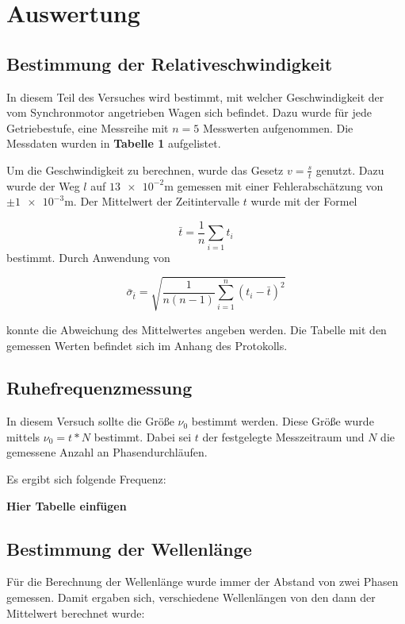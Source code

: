 \section{Auswertung}
\subsection{Bestimmung der Relativeschwindigkeit}

In diesem Teil des Versuches wird bestimmt, mit welcher Geschwindigkeit der vom Synchronmotor angetrieben Wagen sich befindet.
Dazu wurde für jede Getriebestufe, eine Messreihe mit $n=5$ Messwerten aufgenommen.
Die Messdaten wurden in \textbf{Tabelle 1} aufgelistet.

Um die Geschwindigkeit zu berechnen, wurde das Gesetz $v=\frac{s}{t}$
genutzt. Dazu wurde der Weg $l$ auf $\num{13e-2}\si{\meter}$ gemessen mit einer Fehlerabschätzung von $\pm\num{1e-3}\si{\meter}$. 
Der Mittelwert der Zeitintervalle $t$ wurde mit der Formel

\begin{equation*}
\bar{t}=\frac{1}{n}\sum_{i=1}t_i
\end{equation*}
bestimmt. Durch Anwendung von 

\begin{equation*}
\bar{\sigma}_{\bar{t}}=\sqrt{\frac{1}{n(n-1)}\sum_{i=1}^{n}(t_i-\bar{t})^2}
\end{equation*}

konnte die Abweichung des Mittelwertes angeben werden.
Die Tabelle mit den gemessen Werten befindet sich im Anhang des Protokolls.

\subsection{Ruhefrequenzmessung}

In diesem Versuch sollte die Größe $\nu_0$ bestimmt werden. 
Diese Größe wurde mittels $\nu_0=t*N$ bestimmt. Dabei sei $t$ der 
festgelegte Messzeitraum und $N$ die gemessene Anzahl an Phasendurchläufen. 

Es ergibt sich folgende Frequenz:

\textbf{Hier Tabelle einfügen}

\subsection{Bestimmung der Wellenlänge} 
Für die Berechnung der Wellenlänge wurde immer der Abstand von 
zwei Phasen gemessen. 
Damit ergaben sich, verschiedene Wellenlängen von den dann 
der Mittelwert berechnet wurde:

